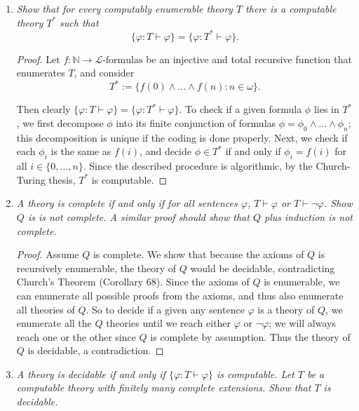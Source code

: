 \documentclass{article}
\begin{document}
\begin{enumerate}[label={\bf Q\arabic*:}]
  \item \it Show that for every computably enumerable theory $T$ there is
    a computable theory $T^*$ such that
    \[\{\varphi:T\vdash\varphi\} = \{\varphi:T^*\vdash\varphi\}.\]

    \begin{proof}
      Let $f:\mathbb{N}\rightarrow\mathcal{L}\text{-formulas}$ be an
      injective and total recursive function that enumerates $T$, and
      consider
      \[T^*:=\{f(0)\wedge\ldots\wedge f(n): n\in\omega\}.\]

      Then clearly $\{\varphi:T\vdash\varphi\}
      =\{\varphi:T^*\vdash\varphi\}$. To check if a given formula $\phi$
      lies in $T^*$, we first decompose $\phi$ into its finite conjunction
      of formulas $\phi=\phi_0\wedge\ldots\wedge\phi_n$; this decomposition
      is unique if the coding is done properly. Next, we check if each
      $\phi_i$ is the same as $f(i)$, and decide $\phi\in T^*$ if and only
      if $\phi_i=f(i)$ for all $i\in\{0,\ldots,n\}$. Since the described
      procedure is algorithmic, by the Church-Turing thesis, $T^*$ is
      computable.
    \end{proof}

  \item \it A theory is complete if and only if for all sentences
    $\varphi$, $T\vdash\varphi$ or $T\vdash\neg\varphi$. Show $Q$ is is not
    complete. A similar proof should show that $Q$ plus induction is not
    complete.

    \begin{proof}
      Assume $Q$ is complete. We show that because the axioms of $Q$ is
      recursively enumerable, the theory of $Q$ would be decidable,
      contradicting Church's Theorem (Corollary 68). Since the axioms of
      $Q$ is enumerable, we can enumerate all possible proofs from the
      axioms, and thus also enumerate all theories of $Q$. So to decide if
      a given any sentence $\varphi$ is a theory of $Q$, we enumerate all
      the $Q$ theories until we reach either $\varphi$ or $\neg\varphi$; we
      will always reach one or the other since $Q$ is complete by
      assumption. Thus the theory of $Q$ is decidable, a contradiction.
    \end{proof}

  \item \it A theory is decidable if and only if
    $\{\varphi:T\vdash\varphi\}$ is computable. Let $T$ be a computable
    theory with finitely many complete extensions. Show that $T$ is
    decidable.


\end{enumerate}
\end{document}
